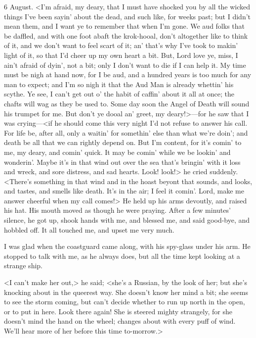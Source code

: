 \begin{diary}{6 August.}
<I'm afraid, my deary, that I must have shocked you by all the wicked things I've been sayin' about the dead, and such like, for weeks past; but I didn't mean them, and I want ye to remember that when I'm gone. We aud folks that be daffled, and with one foot abaft the krok-hooal, don't altogether like to think of it, and we don't want to feel scart of it; an' that's why I've took to makin' light of it, so that I'd cheer up my own heart a bit. But, Lord love ye, miss, I ain't afraid of dyin', not a bit; only I don't want to die if I can help it. My time must be nigh at hand now, for I be aud, and a hundred years is too much for any man to expect; and I'm so nigh it that the Aud Man is already whettin' his scythe. Ye see, I can't get out o' the habit of caffin' about it all at once; the chafts will wag as they be used to. Some day soon the Angel of Death will sound his trumpet for me. But don't ye dooal an' greet, my deary!>—for he saw that I was crying—<if he should come this very night I'd not refuse to answer his call. For life be, after all, only a waitin' for somethin' else than what we're doin'; and death be all that we can rightly depend on. But I'm content, for it's comin' to me, my deary, and comin' quick. It may be comin' while we be lookin' and wonderin'. Maybe it's in that wind out over the sea that's bringin' with it loss and wreck, and sore distress, and sad hearts. Look! look!> he cried suddenly. <There's something in that wind and in the hoast beyont that sounds, and looks, and tastes, and smells like death. It's in the air; I feel it comin'. Lord, make me answer cheerful when my call comes!> He held up his arms devoutly, and raised his hat. His mouth moved as though he were praying. After a few minutes' silence, he got up, shook hands with me, and blessed me, and said good-bye, and hobbled off. It all touched me, and upset me very much.

I was glad when the coastguard came along, with his spy-glass under his arm. He stopped to talk with me, as he always does, but all the time kept looking at a strange ship.

<I can't make her out,> he said; <she's a Russian, by the look of her; but she's knocking about in the queerest way. She doesn't know her mind a bit; she seems to see the storm coming, but can't decide whether to run up north in the open, or to put in here. Look there again! She is steered mighty strangely, for she doesn't mind the hand on the wheel; changes about with every puff of wind. We'll hear more of her before this time to-morrow.>
\end{diary}